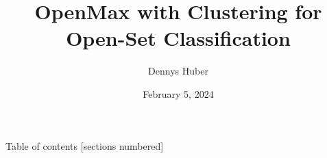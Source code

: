 \documentclass{beamer}
\title{OpenMax with Clustering for Open-Set Classification}
\date{February 5, 2024}
\author{Dennys Huber}
\institute{University of Zurich}
\begin{document}
\maketitle

\begin{frame}{Table of contents}
	[sections numbered]
	\tableofcontents%
\end{frame}






\end{document}
